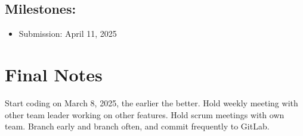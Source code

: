 \documentclass{report}
\begin{document}
\subsection*{Milestones:}
\begin{itemize}
    \item Submission: April 11, 2025
\end{itemize}

\section*{Final Notes}
Start coding on March 8, 2025, the earlier the better. Hold weekly meeting with other team leader working on other features.
Hold scrum meetings with own team. Branch early and branch often, and commit frequently to GitLab.
\end{document}

